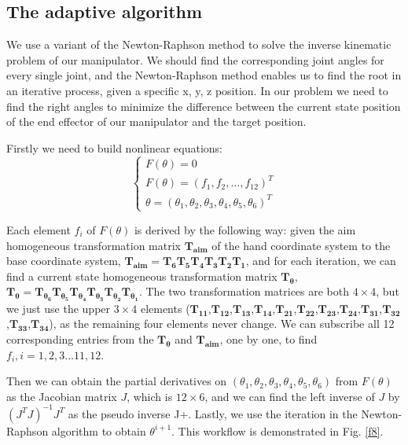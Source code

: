 \documentclass{ieeeaccess}
\begin{document}
\subsection{The adaptive algorithm}

We use a variant of the Newton-Raphson method to solve the inverse kinematic problem of our manipulator. We should find the corresponding joint angles for every single joint, and the Newton-Raphson method enables us to find the root in an iterative process, given a specific x, y, z position. In our problem we need to find the right angles to minimize the difference between the current state position of the end effector of our manipulator and the target position.

Firstly we need to build nonlinear equations: 
\begin{equation}
\begin{cases}
F(\theta) = 0\\
F(\theta) = (f_1,f_2,\dots,f_{12})^T\\
\theta = (\theta_1, \theta_2, \theta_3, \theta_4, \theta_5, \theta_6)^T
\end{cases}
\end{equation}

Each element $f_i$ of $F(\theta)$ is derived by the following way: given the aim homogeneous transformation matrix $\mathbf{T_{aim}}$ of the hand coordinate system to the base coordinate system, 
$\mathbf{T_{aim}}=\mathbf{T_{6}}\mathbf{T_{5}}\mathbf{T_{4}}\mathbf{T_{3}}\mathbf{T_{2}}\mathbf{T_{1}}$,
and for each iteration, we can find a current state homogeneous transformation matrix 
$\mathbf{T_\theta}$,  $\mathbf{T_\theta} = 
\mathbf{T_{\theta_6}}\mathbf{T_{\theta_5}}\mathbf{T_{\theta_4}}\mathbf{T_{\theta_3}}\mathbf{T_{\theta_2}}\mathbf{T_{\theta_1}}$.
The two transformation matrices are both $4 \times 4$, but we just use the upper $3 \times 4$ elements ($\mathbf{T_{11}}$,$\mathbf{T_{12}}$,$\mathbf{T_{13}}$,$\mathbf{T_{14}}$,$\mathbf{T_{21}}$,$\mathbf{T_{22}}$,$\mathbf{T_{23}}$,$\mathbf{T_{24}}$,$\mathbf{T_{31}}$,$\mathbf{T_{32}}$,$\mathbf{T_{33}}$,$\mathbf{T_{34}}$), as the remaining four elements never change. We can subscribe all 12 corresponding entries from the $\mathbf{T_\theta}$ and $\mathbf{T_{aim}}$, one by one, to find $f_i, i=1,2,3 \dots 11,12$. 


Then we can obtain the partial derivatives on $(\theta_1,\theta_2,\theta_3,\theta_4,\theta_5,\theta_6)$
from $F(\theta)$ as the Jacobian matrix $J$, which is $12 \times 6$, and we can find the left inverse of $J$ by $(J^TJ)^{-1}J^T$ as the pseudo inverse J+. Lastly, we use the iteration in the Newton-Raphson algorithm to obtain $\theta^{i+1}$. This workflow is demonstrated in Fig. \ref{f8}.
\end{document}
